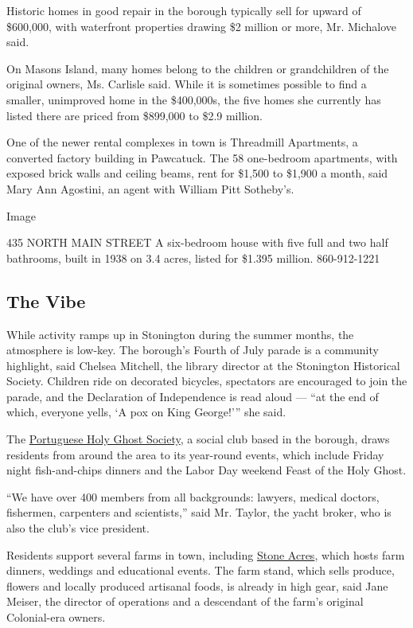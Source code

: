 Historic homes in good repair in the borough typically sell for upward
of \$600,000, with waterfront properties drawing \$2 million or more,
Mr. Michalove said.

On Masons Island, many homes belong to the children or grandchildren of
the original owners, Ms. Carlisle said. While it is sometimes possible
to find a smaller, unimproved home in the \$400,000s, the five homes she
currently has listed there are priced from \$899,000 to \$2.9 million.

One of the newer rental complexes in town is Threadmill Apartments, a
converted factory building in Pawcatuck. The 58 one-bedroom apartments,
with exposed brick walls and ceiling beams, rent for \$1,500 to \$1,900
a month, said Mary Ann Agostini, an agent with William Pitt Sotheby's.

Image

435 NORTH MAIN STREET \textbar{} A six-bedroom house with five full and
two half bathrooms, built in 1938 on 3.4 acres, listed for \$1.395
million. 860-912-1221

\hypertarget{the-vibe}{%
\subsection{The Vibe}\label{the-vibe}}

While activity ramps up in Stonington during the summer months, the
atmosphere is low-key. The borough's Fourth of July parade is a
community highlight, said Chelsea Mitchell, the library director at the
Stonington Historical Society. Children ride on decorated bicycles,
spectators are encouraged to join the parade, and the Declaration of
Independence is read aloud --- ``at the end of which, everyone yells, `A
pox on King George!''' she said.

The \href{http://www.holyghostclub.com/}{Portuguese Holy Ghost Society},
a social club based in the borough, draws residents from around the area
to its year-round events, which include Friday night fish-and-chips
dinners and the Labor Day weekend Feast of the Holy Ghost.

``We have over 400 members from all backgrounds: lawyers, medical
doctors, fishermen, carpenters and scientists,'' said Mr. Taylor, the
yacht broker, who is also the club's vice president.

Residents support several farms in town, including
\href{https://www.stoneacresfarm.com/}{Stone Acres}, which hosts farm
dinners, weddings and educational events. The farm stand, which sells
produce, flowers and locally produced artisanal foods, is already in
high gear, said Jane Meiser, the director of operations and a descendant
of the farm's original Colonial-era owners.

